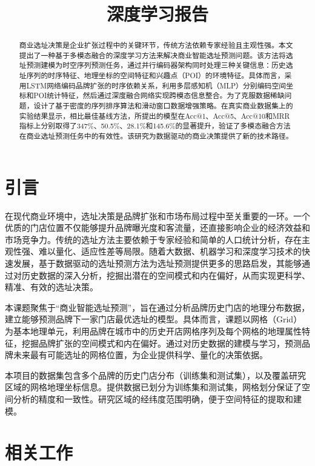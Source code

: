 \documentclass{article}
\title{深度学习报告}
\begin{document}
\maketitle

\begin{abstract}
商业选址决策是企业扩张过程中的关键环节，传统方法依赖专家经验且主观性强。本文提出了一种基于多模态融合的深度学习方法来解决商业智能选址预测问题。该方法将选址预测建模为时空序列预测任务，通过并行编码器架构同时处理三种关键信息：历史选址序列的时序特征、地理坐标的空间特征和兴趣点（POI）的环境特征。具体而言，采用LSTM网络编码品牌扩张的时序依赖关系，利用多层感知机（MLP）分别编码空间坐标和POI统计特征，然后通过深度融合网络实现跨模态信息整合。为了克服数据稀缺问题，设计了基于密度的序列排序算法和滑动窗口数据增强策略。在真实商业数据集上的实验结果显示，相比最佳基线方法，所提出的模型在Acc@1、Acc@5、Acc@10和MRR指标上分别取得了347\%、50.5\%、28.1\%和145.6\%的显著提升，验证了多模态融合方法在商业选址预测任务中的有效性。该研究为数据驱动的商业决策提供了新的技术路径。
\end{abstract}
\newpage

\tableofcontents
\newpage
\section{引言}
在现代商业环境中，选址决策是品牌扩张和市场布局过程中至关重要的一环。一个优质的门店位置不仅能够提升品牌曝光度和客流量，还直接影响企业的经济效益和市场竞争力。传统的选址方法主要依赖于专家经验和简单的人口统计分析，存在主观性强、难以量化、适应性差等局限。随着大数据、机器学习和深度学习技术的快速发展，基于数据驱动的选址预测方法为选址预测提供更多的思路启发，其能够通过对历史数据的深入分析，挖掘出潜在的空间模式和内在偏好，从而实现更科学、精准、有效的选址决策。

本课题聚焦于“商业智能选址预测”，旨在通过分析品牌历史门店的地理分布数据，建立能够预测品牌下一家门店最优选址的模型。具体而言，课题以网格（Grid）为基本地理单元，利用品牌在城市中的历史开店网格序列及每个网格的地理属性特征，挖掘品牌扩张的空间模式和内在偏好。通过对历史数据的建模与学习，预测品牌未来最有可能选址的网格位置，为企业提供科学、量化的决策依据。

本项目的数据集包含多个品牌的历史门店分布（训练集和测试集），以及覆盖研究区域的网格地理坐标信息。提供数据已划分为训练集和测试集，网格划分保证了空间分析的精度和一致性。研究区域的经纬度范围明确，便于空间特征的提取和建模。

\section{相关工作}
\end{document}
